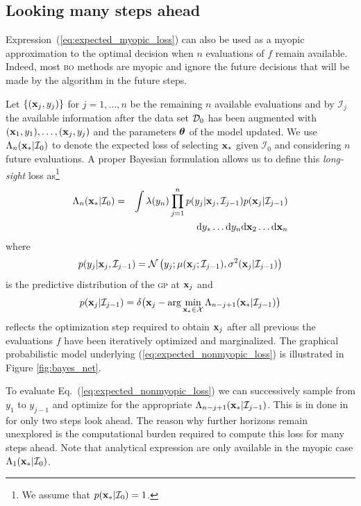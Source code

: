 \documentclass[twoside]{article}
\newcommand{\I}{\mathcal{I}}
\newcommand{\ud}{\mathrm{d}}
\newcommand{\acr}[1]{\textsc{#1}\xspace}
\newcommand{\gp}{\acr{gp}}
\newcommand{\bo}{\acr{bo}}
\begin{document}
\subsection{Looking many steps ahead}
Expression~(\ref{eq:expected_myopic_loss}) can also be used as a myopic approximation to the optimal decision when $n$ evaluations of $f$ remain available. Indeed, most \bo methods are myopic and ignore the future decisions that will be made by the algorithm in the future steps. 

Let $\{(\mathbf{x}_j,y_j)\}$ for $j=1,\dots,n$ be the remaining $n$ available evaluations and by $\I_j$ the available information after the data set $\mathcal{D}_0$ has been augmented with $(\mathbf{x}_1,y_1),\dots,(\mathbf{x}_j,y_j)$ and the parameters $\boldsymbol{\theta}$ of the model updated. We use $\Lambda_n(\latentVector_*|\I_0 )$ to denote the expected loss of selecting $\mathbf{x}_*$ given $\I_0$ and  considering $n$ future evaluations.  A proper Bayesian formulation allows us to define this \emph{long-sight} loss  \citep{osborne_bayesian_2010}  as\footnote{We assume that $p(\latentVector_*|\I_0)=1$.}
\begin{eqnarray}\nonumber
\Lambda_n(\latentVector_*|\I_0 ) &= & \int \lambda(y_n) \prod_{j=1}^{n}p(y_{j}|\latentVector_{j},\I_{j-1}) p(\latentVector_{j}|\I_{j-1})\\\label{eq:expected_nonmyopic_loss}
& & \ud y_*\dots \ud y_n \ud\latentVector_2\dots \ud\latentVector_n
\end{eqnarray}
where 
$$p(y_{j}|\latentVector_{j},\I_{j-1})= \mathcal{N} \left(y_{j};\mu(\latentVector_{j};\I_{j-1}),\sigma^2(\latentVector_{j}|\I_{j-1} ) \right)$$ 
is the predictive distribution of the \gp at $\mathbf{x}_{j}$  and 
$$p(\latentVector_{j}|\I_{j-1}) = \delta \bigr(\latentVector_{j} - \arg \min_{\latentVector_* \in {\mathcal X}} \Lambda_{n-j+1}(\latentVector_*|\I_{j-1})\bigl)$$ 
reflects the optimization step required to obtain $\mathbf{x}_{j}$ after all previous the evaluations $f$ have been iteratively optimized and marginalized.  The graphical probabilistic model underlying (\ref{eq:expected_nonmyopic_loss}) is illustrated in Figure \ref{fig:bayes_net}.

To evaluate Eq.~(\ref{eq:expected_nonmyopic_loss}) we can successively sample from $y_1$ to $y_{j-1}$ and optimize for the appropriate $\Lambda_{n-j+1}(\latentVector_*|\I_{j-1})$. This is in done in \citep{osborne_bayesian_2010} for only two steps look ahead. The reason why further horizons remain unexplored is the  computational burden required to compute this loss for many steps ahead. Note that analytical expression are only available in the myopic case $\Lambda_1(\latentVector_*| \I_0)$.
\end{document}
